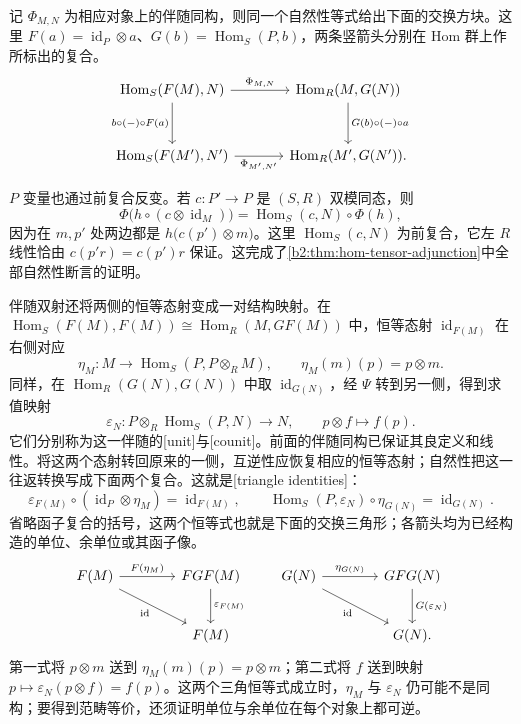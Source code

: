 \ProseParagraphBreak
记 \(\Phi_{M,N}\) 为相应对象上的伴随同构，则同一个自然性等式给出下面的交换方块。这里 \(F(a)=\operatorname{id}_P\otimes a\)、\(G(b)=\operatorname{Hom}_S(P,b)\)，两条竖箭头分别在 Hom 群上作所标出的复合。
\[
	\begin{tikzcd}[column sep=3.5em,row sep=3em]
		\operatorname{Hom}_S(F(M),N)\arrow[r,"\Phi_{M,N}"]\arrow[d,"{b\circ(-)\circ F(a)}"']&\operatorname{Hom}_R(M,G(N))\arrow[d,"{G(b)\circ(-)\circ a}"]\\
		\operatorname{Hom}_S(F(M'),N')\arrow[r,"\Phi_{M',N'}"']&\operatorname{Hom}_R(M',G(N')).
	\end{tikzcd}
\]

\(P\) 变量也通过前复合反变。若 \(c:P'\to P\) 是 \((S,R)\) 双模同态，则
\[
	\Phi\bigl(h\circ(c\otimes\operatorname{id}_M)\bigr) =\operatorname{Hom}_S(c,N)\circ\Phi(h),
\]
因为在 \(m,p'\) 处两边都是 \(h\bigl(c(p')\otimes m\bigr)\)。这里 \(\operatorname{Hom}_S(c,N)\) 为前复合，它左 \(R\) 线性恰由 \(c(p'r)=c(p')r\) 保证。这完成了\cref{b2:thm:hom-tensor-adjunction}中全部自然性断言的证明。

\ProseParagraphBreak
伴随双射还将两侧的恒等态射变成一对结构映射。在 \(\operatorname{Hom}_S(F(M),F(M))\cong\operatorname{Hom}_R(M,GF(M))\) 中，恒等态射 \(\operatorname{id}_{F(M)}\) 在右侧对应
\[
	\eta_M:M\longrightarrow\operatorname{Hom}_S(P,P\otimes_RM), \qquad \eta_M(m)(p)=p\otimes m.
\]
同样，在 \(\operatorname{Hom}_R(G(N),G(N))\) 中取 \(\operatorname{id}_{G(N)}\)，经 \(\Psi\) 转到另一侧，得到求值映射
\[
	\varepsilon_N:P\otimes_R\operatorname{Hom}_S(P,N)\longrightarrow N, \qquad p\otimes f\longmapsto f(p).
\]
它们分别称为这一伴随的[unit]与[counit]。前面的伴随同构已保证其良定义和线性。将这两个态射转回原来的一侧，互逆性应恢复相应的恒等态射；自然性把这一往返转换写成下面两个复合。这就是[triangle identities]：
\[
	\varepsilon_{F(M)}\circ(\operatorname{id}_P\otimes\eta_M) =\operatorname{id}_{F(M)},\qquad \operatorname{Hom}_S(P,\varepsilon_N)\circ\eta_{G(N)} =\operatorname{id}_{G(N)}.
\]
省略函子复合的括号，这两个恒等式也就是下面的交换三角形；各箭头均为已经构造的单位、余单位或其函子像。
\[
	\begin{tikzcd}[column sep=4em,row sep=2.5em]
		F(M)\arrow[r,"F(\eta_M)"]\arrow[dr,"\operatorname{id}"']&FGF(M)\arrow[d,"\varepsilon_{F(M)}"]\\
		&F(M)
	\end{tikzcd}
	\qquad
	\begin{tikzcd}[column sep=4em,row sep=2.5em]
		G(N)\arrow[r,"\eta_{G(N)}"]\arrow[dr,"\operatorname{id}"']&GFG(N)\arrow[d,"G(\varepsilon_N)"]\\
		&G(N).
	\end{tikzcd}
\]
第一式将 \(p\otimes m\) 送到 \(\eta_M(m)(p)=p\otimes m\)；第二式将 \(f\) 送到映射 \(p\mapsto\varepsilon_N(p\otimes f)=f(p)\)。这两个三角恒等式成立时，\(\eta_M\) 与 \(\varepsilon_N\) 仍可能不是同构；要得到范畴等价，还须证明单位与余单位在每个对象上都可逆。

